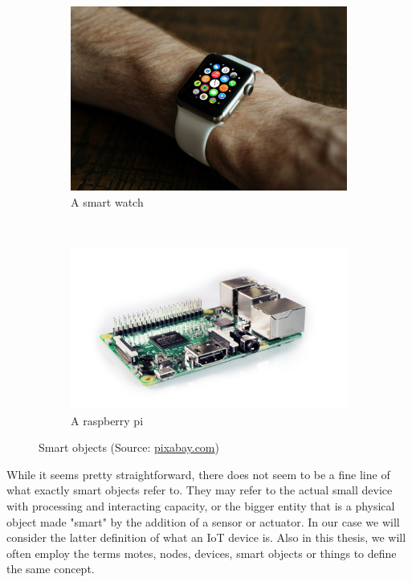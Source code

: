 \begin{figure}
    \centering
    \begin{subfigure}[b]{0.3\textwidth}
        \includegraphics[width=\textwidth]{res/smart_watch}
        \caption{A smart watch}
        \label{fig:smart_watch}
    \end{subfigure}
    ~
    \begin{subfigure}[b]{0.3\textwidth}
        \includegraphics[width=\textwidth]{res/raspberry_pi}
        \caption{A raspberry pi}
        \label{fig:raspberry}
    \end{subfigure}
    \caption{Smart objects (Source: \url{pixabay.com})}\label{fig:smart_objects}
\end{figure}

While it seems pretty straightforward, there does not seem to be a fine line of what exactly smart objects refer to. They may refer to the actual small device with processing and interacting capacity, or the bigger entity that is a physical object made "smart" by the addition of a sensor or actuator. In our case we will consider the latter definition of what an IoT device is. Also in this thesis, we will often employ the terms motes, nodes, devices, smart objects or things to define the same concept. \\

